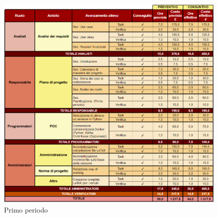 \begin{figure}[H]
    \centering
    \includegraphics[height=0.9\textwidth]{../Images/periodo1.PNG}
    \caption{Primo periodo}
    \label{fig:Primo_periodo}
\end{figure}

